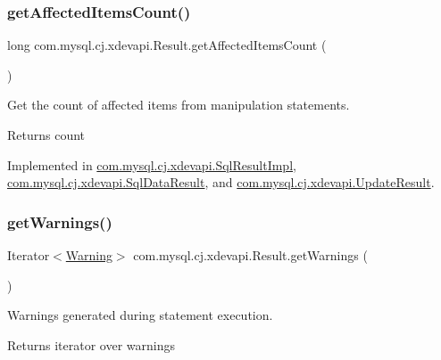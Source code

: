 \subsubsection{\texorpdfstring{get\+Affected\+Items\+Count()}{getAffectedItemsCount()}}
{\footnotesize\ttfamily long com.\+mysql.\+cj.\+xdevapi.\+Result.\+get\+Affected\+Items\+Count (\begin{DoxyParamCaption}{ }\end{DoxyParamCaption})}

Get the count of affected items from manipulation statements.

\begin{DoxyReturn}{Returns}
count 
\end{DoxyReturn}


Implemented in \mbox{\hyperlink{classcom_1_1mysql_1_1cj_1_1xdevapi_1_1_sql_result_impl_a4fe6c0a9ccb9785f48c25bbeebec10e2}{com.\+mysql.\+cj.\+xdevapi.\+Sql\+Result\+Impl}}, \mbox{\hyperlink{classcom_1_1mysql_1_1cj_1_1xdevapi_1_1_sql_data_result_a84d9f2a000e9babce642708126dbb124}{com.\+mysql.\+cj.\+xdevapi.\+Sql\+Data\+Result}}, and \mbox{\hyperlink{classcom_1_1mysql_1_1cj_1_1xdevapi_1_1_update_result_a0af03ef8678c7e0aba1569e7bda5b979}{com.\+mysql.\+cj.\+xdevapi.\+Update\+Result}}.

\mbox{\label{interfacecom_1_1mysql_1_1cj_1_1xdevapi_1_1_result_a7bd12aba36fc02a31c8fd546fe731e98}} 
\subsubsection{\texorpdfstring{get\+Warnings()}{getWarnings()}}
{\footnotesize\ttfamily Iterator$<$\mbox{\hyperlink{interfacecom_1_1mysql_1_1cj_1_1protocol_1_1_warning}{Warning}}$>$ com.\+mysql.\+cj.\+xdevapi.\+Result.\+get\+Warnings (\begin{DoxyParamCaption}{ }\end{DoxyParamCaption})}

Warnings generated during statement execution.

\begin{DoxyReturn}{Returns}
iterator over warnings 
\end{DoxyReturn}



